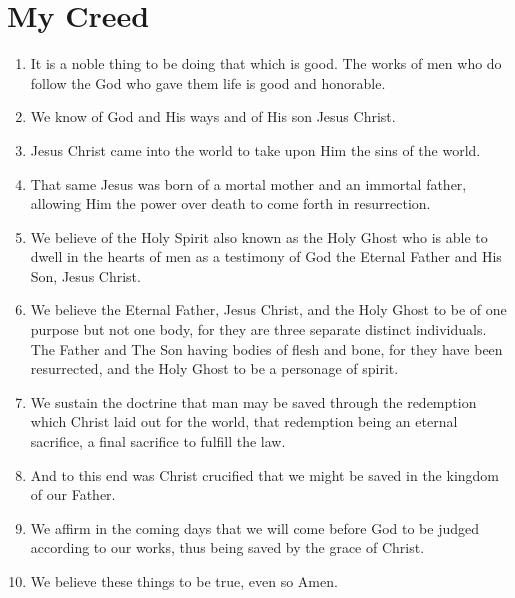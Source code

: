 \chapter{My Creed}
\begin{enumerate}
\item It is a noble thing to be doing that which is good. 
The works of men who do follow the God who gave them life is good 
and honorable.

\item We know of God and His ways and of His son Jesus Christ.

\item Jesus Christ came into the world to take upon Him the sins of the world.

\item  That same Jesus was born of a mortal mother and an immortal father, 
allowing Him the power over death to come forth in resurrection.

\item We believe of the Holy Spirit also known as the Holy Ghost who is 
able to dwell in the hearts of men as a testimony of God the Eternal Father 
and His Son, Jesus Christ.

\item We believe the Eternal Father, Jesus Christ, and the Holy Ghost to be of 
one purpose but not one body, for they are three separate distinct individuals. 
The Father and The Son having bodies of flesh and bone, for they have been 
resurrected, and the Holy Ghost to be a personage of spirit.

\item We sustain the doctrine that man may be saved through the redemption 
which Christ laid out for the world, that redemption being an eternal sacrifice, 
a final sacrifice to fulfill the law.

\item And to this end was Christ crucified that we might be saved in the 
kingdom of our Father.

\item We affirm in the coming days that we will come before God to be 
judged according to our works, thus being saved by the grace of Christ.

\item We believe these things to be true, even so Amen.
\end{enumerate}